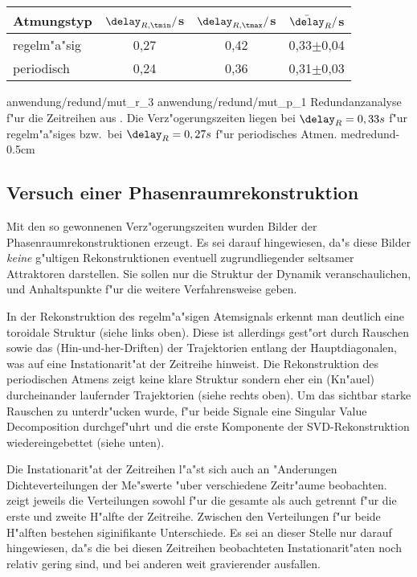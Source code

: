 \begin{center}
\begin{tabular}{|l||c|c|c|}
  \hline
  Atmungstyp & $\delay_{R,\tmin}/$s & $\delay_{R,\tmax}/$s & $\bar \delay_{R}/$s \\
  \hline
  regelm"a"sig   &  0,27 &  0,42   &  0,33$\pm$0,04 \\
  periodisch        &  0,24 &  0,36   &  0,31$\pm$0,03 \\
  \hline
\end{tabular}
\end{center}

\epsfigdouble
{anwendung/redund/mut_r_3}
{anwendung/redund/mut_p_1}
{Redundanzanalyse f"ur die Zeitreihen aus . Die Verz"ogerungszeiten
  liegen bei $\delay_R=0,33 s$ f"ur regelm"a"siges bzw.\ bei $\delay_R=0,27 s$ f"ur
  periodisches Atmen. 
}
{medredund}{-0.5cm}

\subsection{Versuch einer Phasenraumrekonstruktion}
Mit den so gewonnenen Verz"ogerungszeiten wurden Bilder der Phasenraumrekonstruktionen
erzeugt. Es sei darauf hingewiesen, da"s diese Bilder {\em keine} g"ultigen
Rekonstruktionen eventuell zugrundliegender seltsamer Attraktoren darstellen. Sie sollen
nur die Struktur der Dynamik veranschaulichen, und Anhaltspunkte f"ur die weitere
Verfahrensweise geben.

In der Rekonstruktion des regelm"a"sigen Atemsignals erkennt man deutlich eine toroidale
Struktur (siehe  links oben). Diese ist allerdings gest"ort durch Rauschen
sowie das \naja(Hin-und-her-Driften) der Trajektorien entlang der Hauptdiagonalen, was auf
eine Instationarit"at der Zeitreihe hinweist. Die Rekonstruktion des periodischen Atmens
zeigt keine klare Struktur sondern eher ein \naja(Kn"auel) durcheinander laufernder
Trajektorien (siehe  rechts oben).  Um das sichtbar starke Rauschen zu
unterdr"ucken wurde, f"ur beide Signale eine Singular Value Decomposition durchgef"uhrt und
die erste Komponente der SVD-Rekonstruktion wiedereingebettet (siehe 
unten).

Die Instationarit"at der Zeitreihen l"a"st sich auch an "Anderungen Dichteverteilungen der
Me"swerte "uber verschiedene Zeitr"aume beobachten.  zeigt jeweils die
Verteilungen sowohl f"ur die gesamte als auch getrennt f"ur die erste und zweite H"alfte
der Zeitreihe. Zwischen den Verteilungen f"ur beide H"alften bestehen siginifikante
Unterschiede. Es sei an dieser Stelle nur darauf hingewiesen, da"s die bei diesen
Zeitreihen beobachteten Instationarit"aten noch relativ gering sind, und bei anderen weit
gravierender ausfallen.

